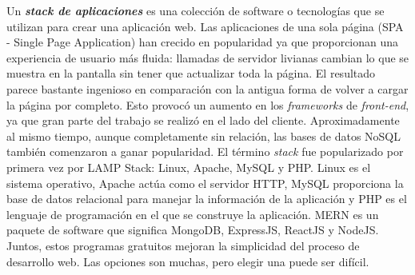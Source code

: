 \thispagestyle{fancy}
\setcounter{page}{1}  %
\thispagestyle{empty}  %
Un \textbf{\textit{stack de aplicaciones}} es una colección de software o tecnologías que se utilizan para crear una aplicación web. Las aplicaciones de una sola página (SPA - Single Page Application) han crecido en popularidad ya que proporcionan una experiencia de usuario más fluida: llamadas de servidor livianas cambian lo que se muestra en la pantalla sin tener que actualizar toda la página. El resultado parece bastante ingenioso en comparación con la antigua forma de volver a cargar la página por completo. Esto provocó un aumento en los \textit{frameworks} de \textit{front-end}, ya que gran parte del trabajo se realizó en el lado del cliente. Aproximadamente al mismo tiempo, aunque completamente sin relación, las bases de datos NoSQL también comenzaron a ganar popularidad. El término \textit{stack} fue popularizado por primera vez por LAMP Stack: Linux, Apache, MySQL y PHP. Linux es el sistema operativo, Apache actúa como el servidor HTTP, MySQL proporciona la base de datos relacional para manejar la información de la aplicación y PHP es el lenguaje de programación en el que se construye la aplicación. MERN es un paquete de software que significa MongoDB, ExpressJS, ReactJS y NodeJS. Juntos, estos programas gratuitos mejoran la simplicidad del proceso de desarrollo web. Las opciones son muchas, pero elegir una puede ser difícil.